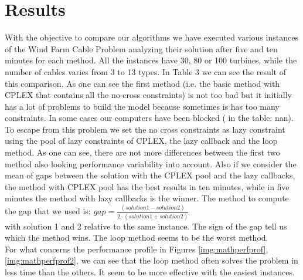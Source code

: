 \section{Results}
With the objective to compare our algorithms we have executed various instances
of the Wind Farm Cable Problem analyzing their solution after five and ten minutes for each method. All the instances have 30, 80 or 100 turbines, while the number of cables varies from 3 to 13 types. In Table 3 we can see the result of this comparison. As one can see the first method (i.e. the basic method with \textsc{CPLEX} that contains all the no-cross constraints) is not too bad but it initially has a lot of problems to build the model because sometimes is has too many constraints. In some cases our computers have been blocked ( in the table: nan). To escape from this problem we set the no cross constraints as lazy constraint using the pool of lazy constraints of \textsc{CPLEX}, the lazy callback and the loop method. As one can see, there are not more differences between the first two method also looking performance variability into account. Also if we consider the mean of gaps between the solution with the \textsc{CPLEX} pool and the lazy callbacks, the method with \textsc{CPLEX} pool has the best results in ten minutes, while in five minutes the method with lazy callbacks is the winner. The method to compute the gap that we used is:
$gap = \frac{(solution 1 - solution 2)}{2 \cdot (solution 1 + solution 2)}$ \\
with solution 1 and 2 relative to the same instance. The sign of the gap tell us which the method wins. The loop method seems to be the worst method. \\ 
For what concerns the performance profile in Figures \ref{img:mathperfprof}, \ref{img:mathperfprof2}, we can see that the loop method often solves the problem in less time than the others. It seem to be more effective with the easiest instances. 

